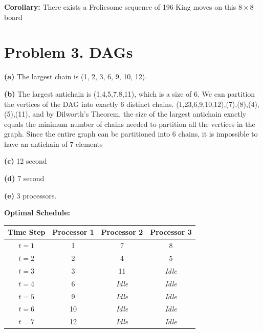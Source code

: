 \documentclass{article}
\begin{document}
\textbf{Corollary:} There exists a Frolicsome sequence of 196 King moves on this $8\times8$ board

\section*{Problem 3. DAGs}

\vspace{\baselineskip}
\noindent\textbf{(a)} The largest chain is (1, 2, 3, 6, 9, 10, 12).

\vspace{\baselineskip}
\noindent\textbf{(b)} The largest antichain is (1,4,5,7,8,11), which is a size of 6.
We can partition the vertices of the DAG into exactly 6 distinct chains.
{(1,23,6,9,10,12),(7),(8),(4),(5),(11)}, and by Dilworth's Theorem, the size of the largest antichain exactly equals the minimum number of chains needed to partition all the vertices in the graph.
Since the entire graph can be partitioned into 6 chains, it is impossible to have an antichain of 7 elements

\vspace{\baselineskip}
\noindent\textbf{(c)} 12 second

\vspace{\baselineskip}
\noindent\textbf{(d)} 7 second

\vspace{\baselineskip}
\noindent\textbf{(e)} 3 processors.

\vspace{1em}
\textbf{Optimal Schedule:}

\begin{center}
\begin{tabular}{|c|c|c|c|}
\hline
\textbf{Time Step} & \textbf{Processor 1} & \textbf{Processor 2} & \textbf{Processor 3} \\ \hline
$t = 1$ & 1 & 7 & 8 \\ \hline
$t = 2$ & 2 & 4 & 5 \\ \hline
$t = 3$ & 3 & 11 & \textit{Idle} \\ \hline
$t = 4$ & 6 & \textit{Idle} & \textit{Idle} \\ \hline
$t = 5$ & 9 & \textit{Idle} & \textit{Idle} \\ \hline
$t = 6$ & 10 & \textit{Idle} & \textit{Idle} \\ \hline
$t = 7$ & 12 & \textit{Idle} & \textit{Idle} \\ \hline
\end{tabular}
\end{center}
\end{document}
